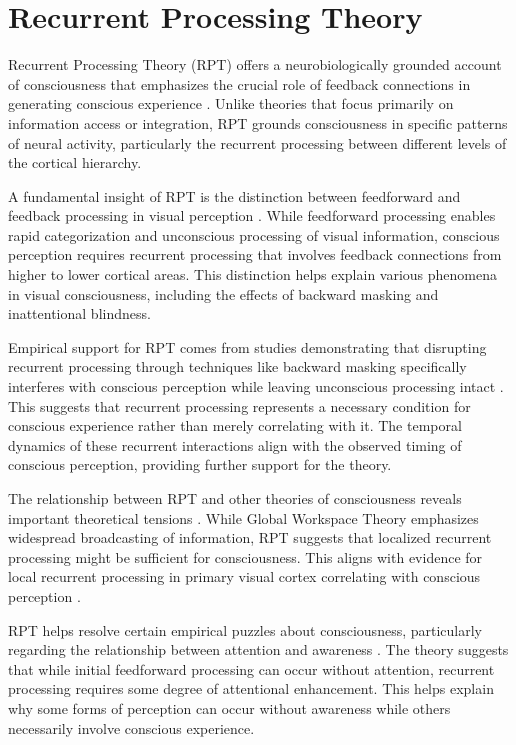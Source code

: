 \section{Recurrent Processing Theory}

Recurrent Processing Theory (RPT) offers a neurobiologically grounded account of consciousness that emphasizes the crucial role of feedback connections in generating conscious experience \cite{Lamme2006}. Unlike theories that focus primarily on information access or integration, RPT grounds consciousness in specific patterns of neural activity, particularly the recurrent processing between different levels of the cortical hierarchy.

A fundamental insight of RPT is the distinction between feedforward and feedback processing in visual perception \cite{Lamme2000}. While feedforward processing enables rapid categorization and unconscious processing of visual information, conscious perception requires recurrent processing that involves feedback connections from higher to lower cortical areas. This distinction helps explain various phenomena in visual consciousness, including the effects of backward masking and inattentional blindness.

Empirical support for RPT comes from studies demonstrating that disrupting recurrent processing through techniques like backward masking specifically interferes with conscious perception while leaving unconscious processing intact \cite{Fahrenfort2007}. This suggests that recurrent processing represents a necessary condition for conscious experience rather than merely correlating with it. The temporal dynamics of these recurrent interactions align with the observed timing of conscious perception, providing further support for the theory.

The relationship between RPT and other theories of consciousness reveals important theoretical tensions \cite{Montemayor2019}. While Global Workspace Theory emphasizes widespread broadcasting of information, RPT suggests that localized recurrent processing might be sufficient for consciousness. This aligns with evidence for local recurrent processing in primary visual cortex correlating with conscious perception \cite{Super2001}.

RPT helps resolve certain empirical puzzles about consciousness, particularly regarding the relationship between attention and awareness \cite{Block2007}. The theory suggests that while initial feedforward processing can occur without attention, recurrent processing requires some degree of attentional enhancement. This helps explain why some forms of perception can occur without awareness while others necessarily involve conscious experience.

